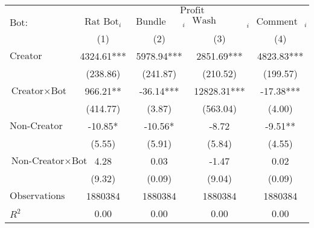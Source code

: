 \begin{tabular}{lcccc}
\hline
 & \multicolumn{4}{c}{$\text{Profit}$} \\
 $\text{Bot}:$ & $\text{Rat Bot}_{i}$ & $\text{Bundle Bot}_{i}$ & $\text{Wash Trading Bot}_{i}$ & $\text{Comment Bot}_{i}$ \\
 & (1) & (2) & (3) & (4)\\
\hline
$\text{Creator}$ & 4324.61*** & 5978.94*** & 2851.69*** & 4823.83*** \\
 & (238.86) & (241.87) & (210.52) & (199.57) \\
$\text{Creator} \times \text{Bot}$ & 966.21** & -36.14*** & 12828.31*** & -17.38*** \\
 & (414.77) & (3.87) & (563.04) & (4.00) \\
$\text{Non-Creator}$ & -10.85* & -10.56* & -8.72 & -9.51** \\
 & (5.55) & (5.91) & (5.84) & (4.55) \\
$\text{Non-Creator} \times \text{Bot}$ & 4.28 & 0.03 & -1.47 & 0.02 \\
 & (9.32) & (0.09) & (9.04) & (0.09) \\
$\text{Observations}$ & 1880384 & 1880384 & 1880384 & 1880384 \\
$R^2$ & 0.00 & 0.00 & 0.00 & 0.00 \\
\hline
\end{tabular}